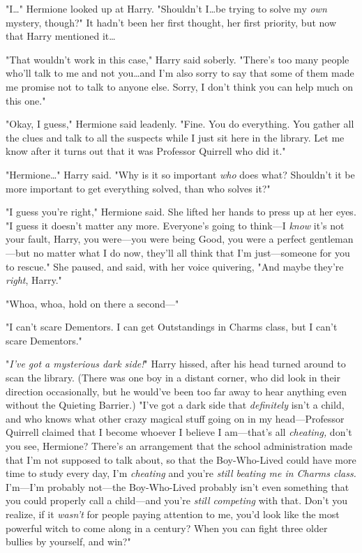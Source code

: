 "I…" Hermione looked up at Harry. "Shouldn’t I…be trying to
solve my \emph{own} mystery, though?" It hadn’t been her first thought, her
first priority, but now that Harry mentioned it…

"That wouldn’t work in this case," Harry said soberly. "There’s too many people
who’ll talk to me and not you…and I’m also sorry to say that some of
them made me promise not to talk to anyone else. Sorry, I don’t think you can
help much on this one."

"Okay, I guess," Hermione said leadenly. "Fine. You do everything. You gather
all the clues and talk to all the suspects while I just sit here in the
library. Let me know after it turns out that it was Professor Quirrell who did
it."

"Hermione…" Harry said. "Why is it so important \emph{who} does what?
Shouldn’t it be more important to get everything solved, than who solves it?"

"I guess you’re right," Hermione said. She lifted her hands to press up at her
eyes. "I guess it doesn’t matter any more. Everyone’s going to think—I
\emph{know} it’s not your fault, Harry, you were—you were being Good, you
were a perfect gentleman—but no matter what I do now, they’ll all think that
I’m just—someone for you to rescue." She paused, and said, with her voice
quivering, "And maybe they’re \emph{right}, Harry."

"Whoa, whoa, hold on there a second—"

"I can’t scare Dementors. I can get Outstandings in Charms class, but I can’t
scare Dementors."

"\emph{I’ve got a mysterious dark side!}" Harry hissed, after his head turned
around to scan the library. (There was one boy in a distant corner, who did
look in their direction occasionally, but he would’ve been too far away to hear
anything even without the Quieting Barrier.) "I’ve got a dark side that
\emph{definitely} isn’t a child, and who knows what other crazy magical stuff
going on in my head—Professor Quirrell claimed that I become whoever I
believe I am—that’s all \emph{cheating,} don’t you see, Hermione? There’s an
arrangement that the school administration made that I’m not supposed to talk
about, so that the Boy-Who-Lived could have more time to study every day, I’m
\emph{cheating} and you’re \emph{still beating me in Charms class.} I’m—I’m
probably not—the Boy-Who-Lived probably isn’t even something that you could
properly call a child—and you’re \emph{still competing} with that. Don’t you
realize, if it \emph{wasn’t} for people paying attention to me, you’d look like
the most powerful witch to come along in a century? When you can fight three
older bullies by yourself, and win?"

